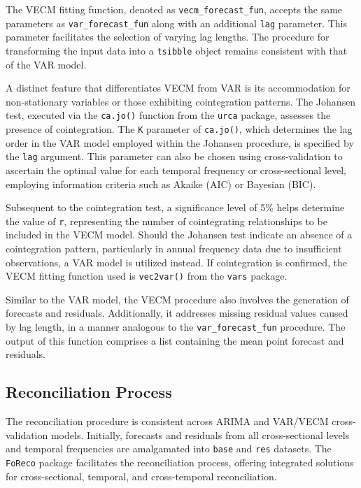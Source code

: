 \documentclass[11pt,a4paper,]{article}
\begin{document}
The VECM fitting function, denoted as \texttt{vecm\_forecast\_fun}, accepts the same parameters as \texttt{var\_forecast\_fun} along with an additional \texttt{lag} parameter. This parameter facilitates the selection of varying lag lengths. The procedure for transforming the input data into a \texttt{tsibble} object remains consistent with that of the VAR model.

A distinct feature that differentiates VECM from VAR is its accommodation for non-stationary variables or those exhibiting cointegration patterns. The Johansen test, executed via the \texttt{ca.jo()} function from the \texttt{urca} package, assesses the presence of cointegration. The \texttt{K} parameter of \texttt{ca.jo()}, which determines the lag order in the VAR model employed within the Johansen procedure, is specified by the \texttt{lag} argument. This parameter can also be chosen using cross-validation to ascertain the optimal value for each temporal frequency or cross-sectional level, employing information criteria such as Akaike (AIC) or Bayesian (BIC).

Subsequent to the cointegration test, a significance level of 5\% helps determine the value of \texttt{r}, representing the number of cointegrating relationships to be included in the VECM model. Should the Johansen test indicate an absence of a cointegration pattern, particularly in annual frequency data due to insufficient observations, a VAR model is utilized instead. If cointegration is confirmed, the VECM fitting function used is \texttt{vec2var()} from the \texttt{vars} package.

Similar to the VAR model, the VECM procedure also involves the generation of forecasts and residuals. Additionally, it addresses missing residual values caused by lag length, in a manner analogous to the \texttt{var\_forecast\_fun} procedure. The output of this function comprises a list containing the mean point forecast and residuals.

\subsection{Reconciliation Process}\label{reconciliation-process}

The reconciliation procedure is consistent across ARIMA and VAR/VECM cross-validation models. Initially, forecasts and residuals from all cross-sectional levels and temporal frequencies are amalgamated into \texttt{base} and \texttt{res} datasets. The \texttt{FoReco} package facilitates the reconciliation process, offering integrated solutions for cross-sectional, temporal, and cross-temporal reconciliation.
\end{document}
